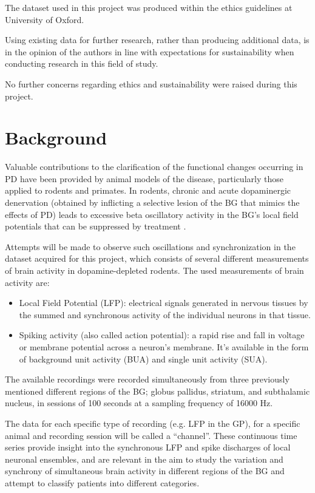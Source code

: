 \documentclass{kththesis}
\begin{document}
The dataset used in this project was produced within the ethics guidelines at University of Oxford.

Using existing data for further research, rather than producing additional data, is in the opinion of the authors in line with expectations for sustainability when conducting research in this field of study.

No further concerns regarding ethics and sustainability were raised during this project.

\newpage
\chapter{Background}

Valuable contributions to the clarification of the functional changes occurring in PD have been provided by animal models of the disease, particularly those applied to rodents and primates. 
In rodents, chronic and acute dopaminergic denervation (obtained by inflicting a selective lesion of the BG that mimics the effects of PD) leads to excessive beta oscillatory activity in the BG's local field potentials that can be suppressed by treatment \parencite{Mallet}.

Attempts will be made to observe such oscillations and synchronization in the dataset acquired for this project, which consists of several different measurements of brain activity in dopamine-depleted rodents. 
The used measurements of brain activity are:

\begin{itemize}
    \item Local Field Potential (LFP): electrical signals generated in nervous tissues by the summed and synchronous activity of the individual neurons in that tissue.
    \item Spiking activity (also called action potential): a rapid rise and fall in voltage or membrane potential across a neuron's membrane. It's available in the form of background unit activity (BUA) and single unit activity (SUA).
\end{itemize}

The available recordings were recorded simultaneously from three previously mentioned different regions of the BG; globus pallidus, striatum, and subthalamic nucleus, in sessions of 100 seconds at a sampling frequency of 16000 Hz.

The data for each specific type of recording (e.g. LFP in the GP), for a specific animal and recording session will be called a “channel”. 
These continuous time series provide insight into the synchronous LFP and spike discharges of local neuronal ensembles, and are relevant in the aim to study the variation and synchrony of simultaneous brain activity in different regions of the BG and attempt to classify patients into different categories.
\end{document}
